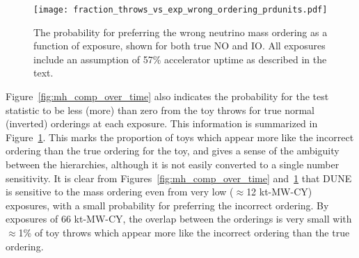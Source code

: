 \begin{figure}[htbp]
  \centering
  \texttt{[image: fraction\_throws\_vs\_exp\_wrong\_ordering\_prdunits.pdf]}
  \caption{The probability for preferring the wrong neutrino mass ordering as a function of exposure, shown for both true NO and IO. All exposures include an assumption of 57\% accelerator uptime as described in the text.}
  \label{fig:mh_wrong}
\end{figure}
Figure~\ref{fig:mh_comp_over_time} also indicates the probability for the test statistic \dchisqMO to be less (more) than zero from the toy throws for true normal (inverted) orderings at each exposure. This information is summarized in Figure~\ref{fig:mh_wrong}. This marks the proportion of toys which appear more like the incorrect ordering than the true ordering for the toy, and gives a sense of the ambiguity between the hierarchies, although it is not easily converted to a single number sensitivity. It is clear from Figures~\ref{fig:mh_comp_over_time} and~\ref{fig:mh_wrong} that DUNE is sensitive to the mass ordering even from very low ($\approx$12 kt-MW-CY) exposures, with a small probability for preferring the incorrect ordering. By exposures of 66 kt-MW-CY, the overlap between the orderings is very small with $\approx$1\% of toy throws which appear more like the incorrect ordering than the true ordering.

\begin{figure*}[htbp]
  \centering
  \\
  \caption{Fraction of throws for which the DUNE sensitivity to the mass ordering exceeds 1--5$\sigma$ significance, as a function of the true value of \deltacp. Shown for NO, for a number of different exposures. The number of throws used to make each figure is also shown. All exposures include an assumption of 57\% accelerator uptime as described in the text.}
  \label{fig:mh_nh_over_time}
\end{figure*}

